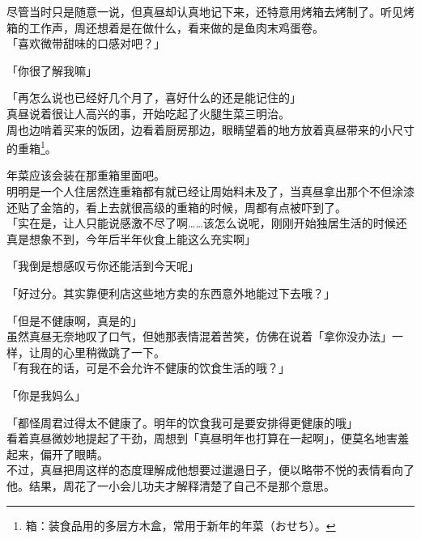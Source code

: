 尽管当时只是随意一说，但真昼却认真地记下来，还特意用烤箱去烤制了。听见烤箱的工作声，周还想着是在做什么，看来做的是鱼肉末鸡蛋卷。\\

「喜欢微带甜味的口感对吧？」

「你很了解我嘛」

「再怎么说也已经好几个月了，喜好什么的还是能记住的」\\

真昼说着很让人高兴的事，开始吃起了火腿生菜三明治。\\

周也边啃着买来的饭团，边看着厨房那边，眼睛望着的地方放着真昼带来的小尺寸的重箱\footnote{箱：装食品用的多层方木盒，常用于新年的年菜（{\jpfont おせち}）。}。

年菜应该会装在那重箱里面吧。\\

明明是一个人住居然连重箱都有就已经让周始料未及了，当真昼拿出那个不但涂漆还贴了金箔的，看上去就很高级的重箱的时候，周都有点被吓到了。\\

「实在是，让人只能说感激不尽了啊……该怎么说呢，刚刚开始独居生活的时候还真是想象不到，今年后半年伙食上能这么充实啊」

「我倒是想感叹亏你还能活到今天呢」

「好过分。其实靠便利店这些地方卖的东西意外地能过下去哦？」

「但是不健康啊，真是的」\\

虽然真昼无奈地叹了口气，但她那表情混着苦笑，仿佛在说着「拿你没办法」一样，让周的心里稍微跳了一下。\\

「有我在的话，可是不会允许不健康的饮食生活的哦？」

「你是我妈么」

「都怪周君过得太不健康了。明年的饮食我可是要安排得更健康的哦」\\

看着真昼微妙地提起了干劲，周想到「真昼明年也打算在一起啊」，便莫名地害羞起来，偏开了眼睛。\\

不过，真昼把周这样的态度理解成他想要过邋遢日子，便以略带不悦的表情看向了他。结果，周花了一小会儿功夫才解释清楚了自己不是那个意思。
